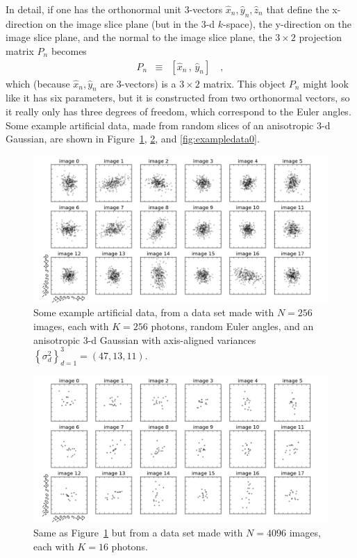 \documentclass[12pt]{article}
\newcommand{\hoggcaption}[1]{\caption{\textsf{#1}}}
\renewcommand{\figurename}{\textsf{Figure}}
\newcommand{\unitvec}[1]{\hat{#1}}
\newcommand{\xhat}{\unitvec{x}}
\newcommand{\yhat}{\unitvec{y}}
\newcommand{\zhat}{\unitvec{z}}
\newcommand{\setof}[1]{\left\{{#1}\right\}}
\begin{document}
In detail, if one has the orthonormal unit 3-vectors
$\xhat_n,\yhat_n,\zhat_n$ that define the x-direction on the image
slice plane (but in the 3-d $k$-space), the y-direction on the image
slice plane, and the normal to the image slice plane, the $3\times 2$
projection matrix $P_n$ becomes
\begin{eqnarray}
  P_n &\equiv& [\xhat_n\,,\,\yhat_n]
  \quad ,
\end{eqnarray}
which (because $\xhat_n,\yhat_n$ are 3-vectors) is a $3\times2$ matrix.
This object $P_n$ might look like it has six parameters, but it is
constructed from two orthonormal vectors, so it really only has three
degrees of freedom, which correspond to the Euler angles.
Some example artificial data, made from random slices of an
anisotropic 3-d Gaussian, are shown in
\figurename~\ref{fig:exampledata8}, \ref{fig:exampledata4}, and \ref{fig:exampledata0}.
\begin{figure}[!htp]
\includegraphics[width=\textwidth]{data_08_08.png}
\hoggcaption{Some example artificial data, from a data set made with
  $N=256$ images, each with $K=256$ photons, random Euler angles, and
  an anisotropic 3-d Gaussian with axis-aligned variances
  $\setof{\sigma^2_d}_{d=1}^3 = (47, 13, 11)$.\label{fig:exampledata8}}
\end{figure}
\begin{figure}[!htp]
\includegraphics[width=\textwidth]{data_12_04.png}
\hoggcaption{Same as \figurename~\ref{fig:exampledata8} but from a data set made with
  $N=4096$ images, each with $K=16$ photons.\label{fig:exampledata4}}
\end{figure}
\end{document}
